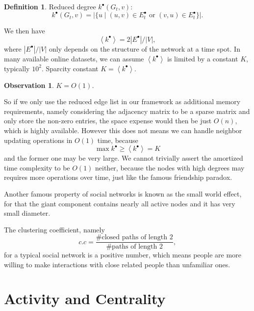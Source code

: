 \documentclass[12pt,abstract=true]{scrartcl}
\numberwithin{equation}{section}
\theoremstyle{definition}   \newtheorem{definition}{Definition}[section]
\theoremstyle{plain}        \newtheorem{theorem}{Theorem}[section]
\theoremstyle{plain}        \newtheorem{observation}{Observation}[section]
\theoremstyle{plain}        \newtheorem{fact}{Fact}[section]
\theoremstyle{plain}        \newtheorem{claim}{Claim}[section]
\theoremstyle{plain}        \newtheorem{lemma}[theorem]{Lemma}
\theoremstyle{plain}        \newtheorem{corollary}[theorem]{Corollary}
\theoremstyle{remark}       \newtheorem{example}{Example}[section]
\theoremstyle{remark}       \newtheorem{remark}{Remark}[section]
\begin{document}
\begin{definition}
Reduced degree $k^\bullet(G_t,v)$:
\begin{equation}
k^\bullet(G_t,v)=\Big|\{u\;|\;(u,v)\in E_t^\bullet\text{ or }(v,u)\in
E_t^\bullet\}\Big|.
\end{equation}
\end{definition}

We then have
\begin{equation}
\left<k^\bullet\right>=2\left|E^\bullet\right|/\left|V\right|,
\end{equation}
where $\left|E^\bullet\right|/\left|V\right|$ only depends on the structure of
the network at a time spot. In many available online datasets,
we can assume $\left<k^\bullet\right>$ is limited by a constant $K$, typically
$10^2$.
 Sparcity constant $K=\left<k^\bullet\right>$.

\begin{observation} $K=O(1)$.
\end{observation}
So if we only use the reduced edge list in our framework as additional memory
requirements, namely considering the adjacency matrix to be a sparse matrix and
only store the non-zero entries, the space expense would then be just $O(n)$,
which is highly available. However this does not means we can handle neighbor
updating operations in $O(1)$ time, because
\begin{equation}
\max k^\bullet\geq \left<k^\bullet\right>=K
\end{equation}
and the former one may be very large.  We cannot trivially assert the amortized
time complexity to be $O(1)$ neither, because the nodes with high degrees may
requires more operations over time, just like the famous friendship
paradox\cite{feld1991your}.

Another famous property of social networks is known as the small world
effect\cite{buchanan2003nexus}, for that the giant component contains nearly
all active nodes and it has very small diameter.

The clustering coefficient\cite{newman2010networks}, namely
\begin{equation}
c.c=\frac{\#\text{closed paths of length 2}}{\#\text{paths of length 2}},
\end{equation}
for a typical social network is a positive number, which means people are more
willing to make interactions with close related people than unfamiliar ones. 

\section{Activity and Centrality}
\end{document}
